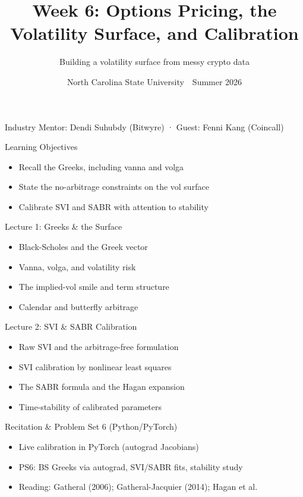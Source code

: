\documentclass[aspectratio=169,11pt]{beamer}
\title{Week 6: Options Pricing, the Volatility Surface, and Calibration}
\subtitle{Building a volatility surface from messy crypto data}
\date{North Carolina State University \,\textbar\, Summer 2026}
\begin{document}
\begin{frame}[plain]\titlepage
\begin{center}\tiny Industry Mentor: Dendi Suhubdy (Bitwyre)  ·  Guest: Fenni Kang (Coincall)\end{center}\end{frame}
\begin{frame}{Learning Objectives}
\begin{itemize}
  \item Recall the Greeks, including vanna and volga
  \item State the no-arbitrage constraints on the vol surface
  \item Calibrate SVI and SABR with attention to stability
\end{itemize}\end{frame}
\begin{frame}{Lecture 1: Greeks \& the Surface}
\begin{itemize}
  \item Black-Scholes and the Greek vector
  \item Vanna, volga, and volatility risk
  \item The implied-vol smile and term structure
  \item Calendar and butterfly arbitrage
\end{itemize}\end{frame}
\begin{frame}{Lecture 2: SVI \& SABR Calibration}
\begin{itemize}
  \item Raw SVI and the arbitrage-free formulation
  \item SVI calibration by nonlinear least squares
  \item The SABR formula and the Hagan expansion
  \item Time-stability of calibrated parameters
\end{itemize}\end{frame}
\begin{frame}{Recitation \& Problem Set 6 (Python/PyTorch)}
\begin{itemize}
  \item Live calibration in PyTorch (autograd Jacobians)
  \item PS6: BS Greeks via autograd, SVI/SABR fits, stability study
  \item Reading: Gatheral (2006); Gatheral-Jacquier (2014); Hagan et al.
\end{itemize}\end{frame}
\end{document}
